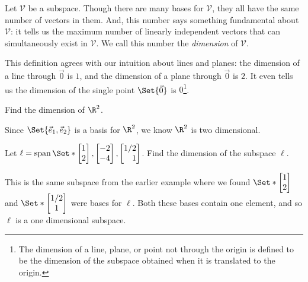 
Let $\mathcal V$ be a subspace. Though there are many bases for $\mathcal V$, they all
have the same number of vectors in them. And, this number says something fundamental about $\mathcal V$:
it tells us the maximum number of linearly independent vectors that can simultaneously exist in $\mathcal V$.
We call this number the \emph{dimension} of $\mathcal V$.


This definition agrees with our intuition about lines and planes: the dimension of a line through $\vec 0$ is $1$, and
the dimension of a plane through $\vec 0$ is $2$. It even tells us the dimension of the single point $\Set{\vec 0}$
is $0$\footnote{ The dimension of a line, plane, or point
not through the origin is defined to be the dimension of the subspace obtained
when it is translated to the origin.}.

\begin{example}
	Find the dimension of $\R^2$.

	Since $\Set{\xhat, \yhat}$ is a basis for $\R^2$, we know $\R^2$ is
	two dimensional.
\end{example}

\begin{example}
	Let $\ell=\Span\Set*{\mat{1\\2},\mat{-2\\-4}, \mat{1/2\\1}}$.
	Find the dimension of the subspace $\ell$.

	This is the same subspace from the earlier example where we found
	$\Set*{\mat{1\\2}}$ and $\Set*{\matc{1/2\\1}}$
	were bases for $\ell$. Both these bases contain one element, and so
	$\ell$ is a one dimensional subspace.
\end{example}

